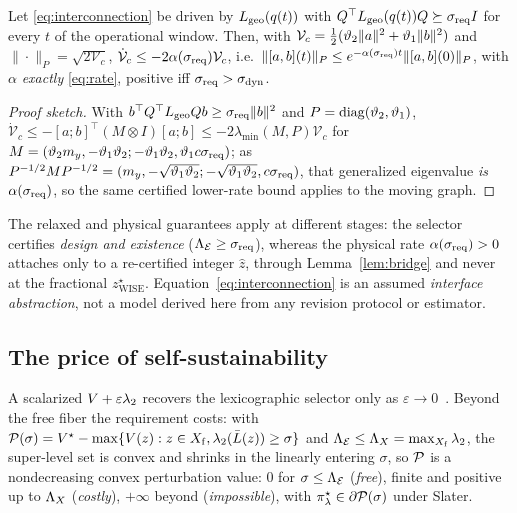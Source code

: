 \begin{corollary}\label{cor:tv}
Let \eqref{eq:interconnection} be driven by $L_{\mathrm{geo}}(q(t))$ with
$Q^{\top}L_{\mathrm{geo}}(q(t))Q\succeq\sigma_{\mathrm{req}} I$ for every $t$ of the operational window. Then, with
$\mathcal V_c=\tfrac12(\vartheta_2\|a\|^2+\vartheta_1\|b\|^2)$ and $\|\cdot\|_P=\sqrt{2\mathcal V_c}$,
$\dot{\mathcal V}_c\le-2\alpha(\sigma_{\mathrm{req}})\mathcal V_c$, i.e.\
$\|[a,b](t)\|_P\le e^{-\alpha(\sigma_{\mathrm{req}})t}\|[a,b](0)\|_P$, with $\alpha$ \emph{exactly}
\eqref{eq:rate}, positive iff $\sigma_{\mathrm{req}}>\sigma_{\mathrm{dyn}}$.
\end{corollary}
\begin{proof}[Proof sketch]
With $b^{\top}Q^{\top}L_{\mathrm{geo}} Qb\ge\sigma_{\mathrm{req}}\|b\|^2$ and $P=\operatorname{diag}(\vartheta_2,\vartheta_1)$,
$\dot{\mathcal V}_c\le-[a;b]^{\top}(M{\otimes}I)[a;b]\le-2\lambda_{\min}(M,P)\mathcal V_c$ for
$M=(\vartheta_2m_y,-\vartheta_1\vartheta_2;-\vartheta_1\vartheta_2,\vartheta_1c\sigma_{\mathrm{req}})$; as
$P^{-1/2}MP^{-1/2}=(m_y,-\sqrt{\vartheta_1\vartheta_2};-\sqrt{\vartheta_1\vartheta_2},c\sigma_{\mathrm{req}})$, that generalized
eigenvalue \emph{is} $\alpha(\sigma_{\mathrm{req}})$, so the same certified lower-rate bound applies to
the moving graph.
\end{proof}
The relaxed and physical guarantees apply at different stages: the selector certifies
\emph{design and existence} ($\Lambda_{\mathcal{E}}\ge\sigma_{\mathrm{req}}$), whereas the physical rate
$\alpha(\sigma_{\mathrm{req}})>0$ attaches only to a re-certified integer $\hat z$, through
Lemma~\ref{lem:bridge} and never at the fractional $z^{\star}_{\mathrm{WISE}}$.
Equation~\eqref{eq:interconnection} is an assumed \emph{interface abstraction}, not a model
derived here from any revision protocol or estimator.

\subsection{The price of self-sustainability}
\label{sec:price}
A scalarized $V+\varepsilon\lambda_2$ recovers the lexicographic selector only as
$\varepsilon\to0$~\cite{facchinei2003fvi}. Beyond the free fiber the requirement costs: with
$\mathcal{P}(\sigma)=V^{\star}-\max\{V(z):z\in X_{\mathrm f},\lambda_2(\bar L(z))\ge\sigma\}$ and
$\Lambda_{\mathcal{E}}\le\Lambda_{X}=\max_{X_{\mathrm f}}\lambda_2$, the super-level set is convex and shrinks in the
linearly entering $\sigma$, so $\mathcal{P}$ is a nondecreasing convex perturbation value: $0$ for
$\sigma\le\Lambda_{\mathcal{E}}$ (\emph{free}), finite and positive up to $\Lambda_{X}$ (\emph{costly}), $+\infty$
beyond (\emph{impossible}), with $\pi_\lambda^{\star}\in\partial\mathcal{P}(\sigma)$ under Slater.

